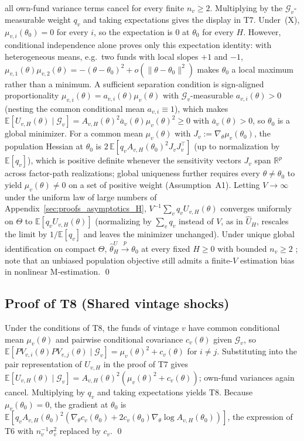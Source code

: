 all own-fund variance terms cancel for every finite $n_v \ge 2$. Multiplying by the $\mathcal{G}_v$-measurable weight $q_v$ and taking expectations gives the display in T7. Under~(X), $\mu_{v,i}(\theta_0) = 0$ for every $i$, so the expectation is $0$ at $\theta_0$ for every $H$. However, conditional independence alone proves only this expectation identity: with heterogeneous means, e.g.\ two funds with local slopes $+1$ and $-1$, $\mu_{v,1}(\theta)\mu_{v,2}(\theta) = -(\theta - \theta_0)^2 + o(\|\theta-\theta_0\|^2)$ makes $\theta_0$ a local maximum rather than a minimum. A sufficient separation condition is sign-aligned proportionality $\mu_{v,i}(\theta) = a_{v,i}(\theta)\mu_v(\theta)$ with $\mathcal{G}_v$-measurable $a_{v,i}(\theta) > 0$ (nesting the common conditional mean $a_{v,i} \equiv 1$), which makes $\mathbb{E}[U_{v,H}(\theta)\mid\mathcal{G}_v] = A_{v,H}(\theta)^2 \bar{a}_v(\theta) \mu_v(\theta)^2 \ge 0$ with $\bar{a}_v(\theta) > 0$, so $\theta_0$ is a global minimizer. For a common mean $\mu_v(\theta)$ with $J_v := \nabla_\theta \mu_v(\theta_0)$, the population Hessian at $\theta_0$ is $2\,\mathbb{E}[q_v A_{v,H}(\theta_0)^2 J_v J_v^\top]$ (up to normalization by $\mathbb{E}[q_v]$), which is positive definite whenever the sensitivity vectors $J_v$ span $\mathbb{R}^p$ across factor-path realizations; global uniqueness further requires every $\theta \neq \theta_0$ to yield $\mu_v(\theta) \neq 0$ on a set of positive weight (Assumption~A1). Letting $V \to \infty$ under the uniform law of large numbers of Appendix~\ref{sec:proofs_asymptotics_H}, $V^{-1}\sum_v q_v U_{v,H}(\theta)$ converges uniformly on $\Theta$ to $\mathbb{E}[q_v U_{v,H}(\theta)]$ (normalizing by $\sum_v q_v$ instead of $V$, as in $\widehat U_H$, rescales the limit by $1/\mathbb{E}[q_v]$ and leaves the minimizer unchanged). Under unique global identification on compact $\Theta$, $\hat\theta_H^U \xrightarrow{p} \theta_0$ at every fixed $H \ge 0$ with bounded $n_v \ge 2$ \citep[Theorem~2.1]{NM94}; note that an unbiased population objective still admits a finite-$V$ estimation bias in nonlinear M-estimation. \qed

\subsection{Proof of T8 (Shared vintage shocks)}
\label{sec:proof_T8}

Under the conditions of T8, the funds of vintage $v$ have common conditional mean $\mu_v(\theta)$ and pairwise conditional covariance $c_v(\theta)$ given $\mathcal{G}_v$, so $\mathbb{E}[PV_{v,i}(\theta)PV_{v,j}(\theta)\mid\mathcal{G}_v] = \mu_v(\theta)^2 + c_v(\theta)$ for $i \neq j$. Substituting into the pair representation of $U_{v,H}$ in the proof of T7 gives $\mathbb{E}[U_{v,H}(\theta)\mid\mathcal{G}_v] = A_{v,H}(\theta)^2(\mu_v(\theta)^2 + c_v(\theta))$; own-fund variances again cancel. Multiplying by $q_v$ and taking expectations yields T8. Because $\mu_v(\theta_0) = 0$, the gradient at $\theta_0$ is $\mathbb{E}[q_v A_{v,H}(\theta_0)^2(\nabla_\theta c_v(\theta_0) + 2c_v(\theta_0)\nabla_\theta\log A_{v,H}(\theta_0))]$, the expression of T6 with $n_v^{-1}\sigma_v^2$ replaced by $c_v$. \qed

